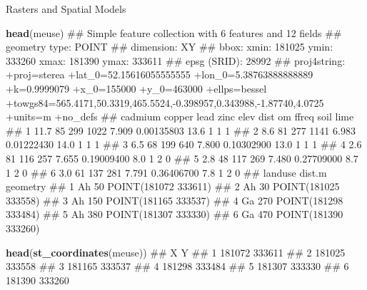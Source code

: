 \documentclass[11pt,ignorenonframetext,]{beamer}
\newenvironment{Shaded}{}{}
\newcommand{\KeywordTok}[1]{\textcolor[rgb]{0.00,0.44,0.13}{\textbf{#1}}}
\newcommand{\NormalTok}[1]{#1}
\let\oldShaded\Shaded
\let\endoldShaded\endShaded
\renewenvironment{Shaded}{\footnotesize\begin{spacing}{0.9}\oldShaded}{\endoldShaded\end{spacing}}
\let\oldverbatim\verbatim
\let\endoldverbatim\endverbatim
\newcommand{\scriptoutput}{
  \renewenvironment{Shaded}{\scriptsize\begin{spacing}{0.9}\oldShaded}{\endoldShaded\end{spacing}}
  \renewenvironment{verbatim}{\scriptsize\begin{spacing}{0.9}\oldverbatim}{\endoldverbatim\end{spacing}}
}
\begin{document}
\begin{frame}[fragile,t]{Rasters and Spatial Models}

\scriptoutput

\begin{Shaded}
\begin{Highlighting}[]
\KeywordTok{head}\NormalTok{(meuse)}
\NormalTok{## Simple feature collection with 6 features and 12 fields}
\NormalTok{## geometry type:  POINT}
\NormalTok{## dimension:      XY}
\NormalTok{## bbox:           xmin: 181025 ymin: 333260 xmax: 181390 ymax: 333611}
\NormalTok{## epsg (SRID):    28992}
\NormalTok{## proj4string:    +proj=sterea +lat_0=52.15616055555555 +lon_0=5.38763888888889 +k=0.9999079 +x_0=155000 +y_0=463000 +ellps=bessel +towgs84=565.4171,50.3319,465.5524,-0.398957,0.343988,-1.87740,4.0725 +units=m +no_defs}
\NormalTok{##   cadmium copper lead zinc  elev       dist   om ffreq soil lime}
\NormalTok{## 1    11.7     85  299 1022 7.909 0.00135803 13.6     1    1    1}
\NormalTok{## 2     8.6     81  277 1141 6.983 0.01222430 14.0     1    1    1}
\NormalTok{## 3     6.5     68  199  640 7.800 0.10302900 13.0     1    1    1}
\NormalTok{## 4     2.6     81  116  257 7.655 0.19009400  8.0     1    2    0}
\NormalTok{## 5     2.8     48  117  269 7.480 0.27709000  8.7     1    2    0}
\NormalTok{## 6     3.0     61  137  281 7.791 0.36406700  7.8     1    2    0}
\NormalTok{##   landuse dist.m             geometry}
\NormalTok{## 1      Ah     50 POINT(181072 333611)}
\NormalTok{## 2      Ah     30 POINT(181025 333558)}
\NormalTok{## 3      Ah    150 POINT(181165 333537)}
\NormalTok{## 4      Ga    270 POINT(181298 333484)}
\NormalTok{## 5      Ah    380 POINT(181307 333330)}
\NormalTok{## 6      Ga    470 POINT(181390 333260)}

\KeywordTok{head}\NormalTok{(}\KeywordTok{st_coordinates}\NormalTok{(meuse))}
\NormalTok{##        X      Y}
\NormalTok{## 1 181072 333611}
\NormalTok{## 2 181025 333558}
\NormalTok{## 3 181165 333537}
\NormalTok{## 4 181298 333484}
\NormalTok{## 5 181307 333330}
\NormalTok{## 6 181390 333260}
\end{Highlighting}
\end{Shaded}

\end{frame}
\end{document}
